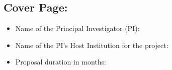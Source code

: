 \subsection*{Cover Page:}
\begin{itemize}
  \item Name of the Principal Investigator (PI):
  \item Name of the PI’s Host Institution for the project:
  \item Proposal duration in months:
\end{itemize}